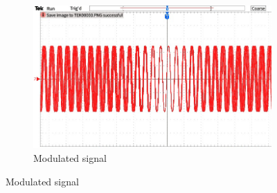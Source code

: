 \documentclass[a4paper,12pt]{article}
\begin{document}
\begin{figure}[H]
	\begin{subfigure}[t]{0.7\textwidth}
		\centering
		\includegraphics[width=1\linewidth]{Images/7}
		\caption{ Modulated signal }
	\end{subfigure}

	
\end{figure}
\end{document}
